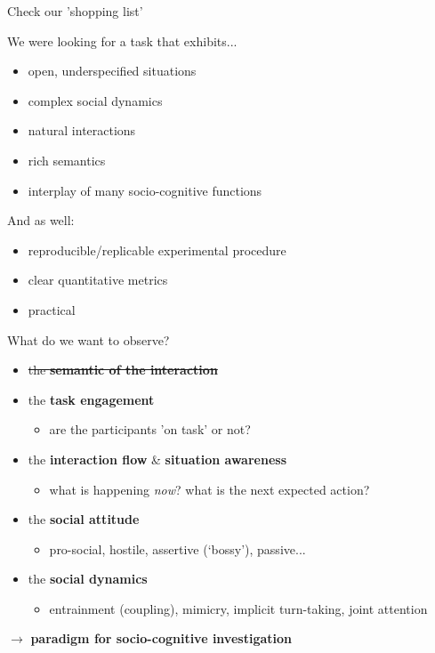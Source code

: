 \documentclass[compress]{beamer}
\begin{document}

\begin{frame}{Check our 'shopping list'}

    We were looking for a task that exhibits...

    \begin{itemize}
        \item open, underspecified situations
            \item complex social dynamics
            \item natural interactions
            \item rich semantics
            \item interplay of many socio-cognitive functions
    \end{itemize}

    \pause
        And as well:
    \begin{itemize}
        \item reproducible/replicable experimental procedure
        \item clear quantitative metrics
        \item practical
    \end{itemize}
\end{frame}


\begin{frame}{What do we want to observe?}

    \begin{itemize}
        \item<+-> \sout{the \textbf{semantic of the interaction}}
        \item<+-> the \textbf{task engagement}
            \begin{itemize}
                \item are the participants 'on task' or not?
            \end{itemize}
        \item<+-> the \textbf{interaction flow} \& \textbf{situation awareness}
            \begin{itemize}
                \item what is happening \emph{now}? what is the next expected
                    action?
            \end{itemize}
        \item<+-> the \textbf{social attitude}
            \begin{itemize}
                \item pro-social, hostile, assertive (‘bossy’), passive...
            \end{itemize}
        \item<+-> the \textbf{social dynamics}
            \begin{itemize}
                \item entrainment (coupling), mimicry, implicit turn-taking, joint
                    attention
            \end{itemize}
    \end{itemize}

    \pause
    $\rightarrow$ {\bf paradigm for socio-cognitive investigation}
\end{frame}
\end{document}
